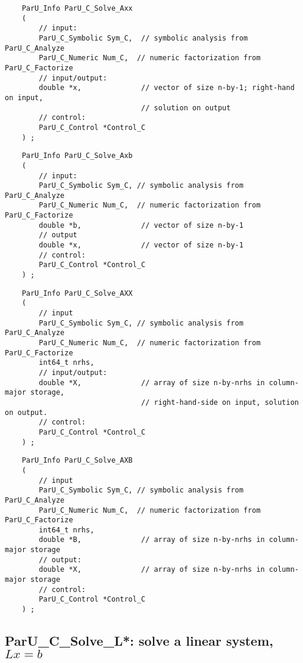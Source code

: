 \documentclass[12pt]{article}
\begin{document}
    {\footnotesize
    \begin{verbatim}
    ParU_Info ParU_C_Solve_Axx
    (
        // input:
        ParU_C_Symbolic Sym_C,  // symbolic analysis from ParU_C_Analyze
        ParU_C_Numeric Num_C,  // numeric factorization from ParU_C_Factorize
        // input/output:
        double *x,              // vector of size n-by-1; right-hand on input,
                                // solution on output
        // control:
        ParU_C_Control *Control_C
    ) ; \end{verbatim} }

    {\footnotesize
    \begin{verbatim}
    ParU_Info ParU_C_Solve_Axb
    (
        // input:
        ParU_C_Symbolic Sym_C, // symbolic analysis from ParU_C_Analyze
        ParU_C_Numeric Num_C,  // numeric factorization from ParU_C_Factorize
        double *b,              // vector of size n-by-1
        // output
        double *x,              // vector of size n-by-1
        // control:
        ParU_C_Control *Control_C
    ) ; \end{verbatim} }

    {\footnotesize
    \begin{verbatim}
    ParU_Info ParU_C_Solve_AXX
    (
        // input
        ParU_C_Symbolic Sym_C, // symbolic analysis from ParU_C_Analyze
        ParU_C_Numeric Num_C,  // numeric factorization from ParU_C_Factorize
        int64_t nrhs,
        // input/output:
        double *X,              // array of size n-by-nrhs in column-major storage,
                                // right-hand-side on input, solution on output.
        // control:
        ParU_C_Control *Control_C
    ) ; \end{verbatim} }

    {\footnotesize
    \begin{verbatim}
    ParU_Info ParU_C_Solve_AXB
    (
        // input
        ParU_C_Symbolic Sym_C, // symbolic analysis from ParU_C_Analyze
        ParU_C_Numeric Num_C,  // numeric factorization from ParU_C_Factorize
        int64_t nrhs,
        double *B,              // array of size n-by-nrhs in column-major storage
        // output:
        double *X,              // array of size n-by-nrhs in column-major storage
        // control:
        ParU_C_Control *Control_C
    ) ; \end{verbatim} }

\subsection{{\sf ParU\_C\_Solve\_L*}: solve a linear system, $Lx=b$}
\end{document}
